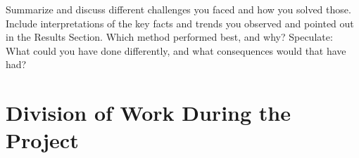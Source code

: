 \documentclass[sigconf]{acmart}
\begin{document}
Summarize and discuss different challenges you faced and how you solved those. Include interpretations of the key facts and trends you observed and pointed out in the Results Section. Which method performed best, and why? Speculate: What could you have done differently, and what consequences would that have had?







\newpage
\appendix
\section{Division of Work During the Project}
\end{document}
